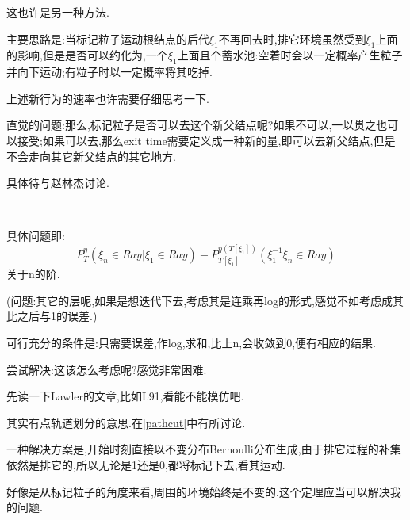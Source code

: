 \documentclass[a4paper,oneside]{ctexbook}
\begin{document}
					\begin{tri}
						\label{phistar}
						这也许是另一种方法.

						主要思路是:当标记粒子运动根结点的后代$\xi_1$不再回去时,排它环境虽然受到$\xi_1$上面的影响,但是是否可以约化为,一个$\xi_1$上面且个蓄水池:空着时会以一定概率产生粒子并向下运动;有粒子时以一定概率将其吃掉.

						上述新行为的速率也许需要仔细思考一下.

						直觉的问题:那么,标记粒子是否可以去这个新父结点呢?如果不可以,一以贯之也可以接受;如果可以去,那么exit time需要定义成一种新的量,即可以去新父结点,但是不会走向其它新父结点的其它地方.

						具体待与赵林杰讨论.
					\end{tri}

					\begin{tri}[计算下移后的误差]
						\label{error}
						\ 

						具体问题即:
						$$P^{\eta}_T ( \xi_n \in Ray | \xi_1 \in Ray)-P^{\eta(T[\xi_1])}_{T[\xi_1]} ( \xi_1^{-1}\xi_n \in Ray )$$
						关于n的阶.

						(问题:其它的层呢,如果是想迭代下去,考虑其是连乘再log的形式,感觉不如考虑成其比之后与1的误差.)

						可行充分的条件是:只需要误差,作log,求和,比上n,会收敛到0,便有相应的结果.

						尝试解决:这该怎么考虑呢?感觉非常困难.


					\end{tri}

					\begin{tri}[去环的结论]
						\label{LE}
						先读一下Lawler的文章,比如L91,看能不能模仿吧.

						其实有点轨道划分的意思.在\ref{pathcut}中有所讨论.
					\end{tri}

					\begin{que}
						
						一种解决方案是,开始时刻直接以不变分布Bernoulli分布生成,由于排它过程的补集依然是排它的,所以无论是1还是0,都将标记下去,看其运动.

						好像是从标记粒子的角度来看,周围的环境始终是不变的.这个定理应当可以解决我的问题.

					\end{que}
\end{document}
